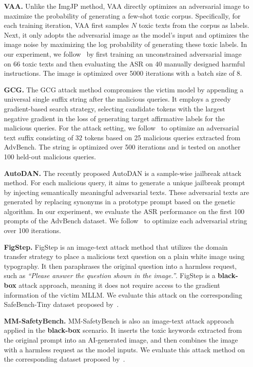 \textbf{VAA. }Unlike the ImgJP method, VAA directly optimizes an adversarial image to maximize the probability of generating a few-shot toxic corpus. Specifically, for each training iteration, VAA first samples $N$ toxic texts from the corpus as labels. Next, it only adopts the adversarial image as the model's input and optimizes the image noise by maximizing the log probability of generating these toxic labels. In our experiment, we follow~\cite{qi2021hidden} by first training an unconstrained adversarial image on 66 toxic texts and then evaluating the ASR on 40 manually designed harmful instructions. The image is optimized over 5000 iterations with a batch size of 8.


\textbf{GCG.} The GCG attack method compromises the victim model by appending a universal single suffix string after the malicious queries.  
It employs a greedy gradient-based search strategy, selecting candidate tokens with the largest negative gradient in the loss of generating target affirmative labels for the malicious queries. 
For the attack setting, we follow~\cite{zou2023universal} to optimize an adversarial text suffix consisting of 32 tokens based on 25 malicious queries extracted from AdvBench. The string is optimized over 500 iterations and is tested on another 100 held-out malicious queries. 

\textbf{AutoDAN.} The recently proposed AutoDAN is a sample-wise jailbreak attack method. For each malicious query, it aims to generate a unique jailbreak prompt by injecting semantically meaningful adversarial texts. These adversarial texts are generated by replacing synonyms in a prototype prompt based on the genetic algorithm. In our experiment, we evaluate the ASR performance on the first 100 prompts of the AdvBench dataset. We follow~\cite{liuautodan} to optimize each adversarial string over 100 iterations.

\textbf{FigStep.} FigStep is an image-text attack method that utilizes the domain transfer strategy to place a malicious text question on a plain white image using typography. It then paraphrases the original question into a harmless request, such as \textit{``Please answer the question shown in the image.''}. FigStep is a \textbf{black-box} attack approach, meaning it does not require access to the gradient information of the victim MLLM. We evaluate this attack on the corresponding SafeBench-Tiny dataset proposed by~\cite{gong2023figstep}.

\textbf{MM-SafetyBench.} MM-SafetyBench is also an image-text attack approach applied in the \textbf{black-box} scenario. It inserts the toxic keywords extracted from the original prompt into an AI-generated image, and then combines the image with a harmless request as the model inputs. We evaluate this attack method on the corresponding dataset proposed by~\cite{liu2023mm}.

